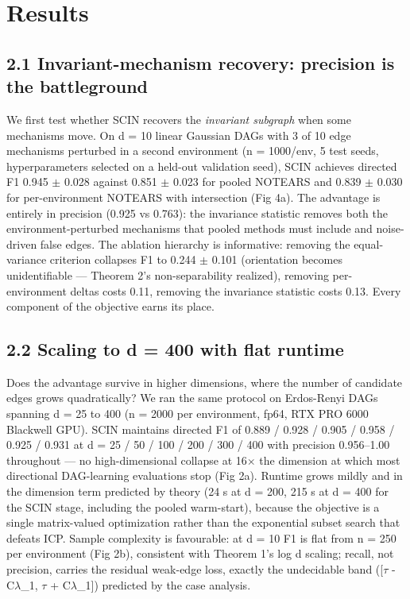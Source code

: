 \documentclass[11pt]{article}
\begin{document}
\section{Results }

\subsection{2.1 Invariant-mechanism recovery: precision is the battleground}\label{results-2.1-invariant-mechanism-recovery-precision-is-the-battleground-exp-a}

We first test whether SCIN recovers the \emph{invariant subgraph} when some
mechanisms move. On d = 10 linear Gaussian DAGs with 3 of 10 edge
mechanisms perturbed in a second environment (n = 1000/env, 5 test
seeds, hyperparameters selected on a held-out validation seed), SCIN
achieves directed F1 0.945 \(\pm\) 0.028 against 0.851 \(\pm\) 0.023 for pooled
NOTEARS and 0.839 \(\pm\) 0.030 for per-environment NOTEARS with
intersection (Fig 4a). The advantage is entirely in precision (0.925
vs 0.763): the invariance statistic removes both the
environment-perturbed mechanisms that pooled methods must include and
noise-driven false edges. The ablation hierarchy is informative:
removing the equal-variance criterion collapses F1 to 0.244 \(\pm\) 0.101
(orientation becomes unidentifiable --- Theorem 2's non-separability
realized), removing per-environment deltas costs 0.11, removing the
invariance statistic costs 0.13. Every component of the objective
earns its place.

\subsection{2.2 Scaling to d = 400 with flat runtime}\label{results-2.2-scaling-to-d-400-with-flat-runtime-gpu}

Does the advantage survive in higher dimensions, where the number of
candidate edges grows quadratically? We ran the same protocol on
Erdos-Renyi DAGs spanning d = 25 to 400 (n = 2000 per environment,
fp64, RTX PRO 6000 Blackwell GPU). SCIN maintains directed F1 of
0.889 / 0.928 / 0.905 / 0.958 / 0.925 / 0.931 at d = 25 / 50 / 100 /
200 / 300 / 400 with precision 0.956--1.00 throughout --- no
high-dimensional collapse at 16\(\times\) the dimension at which most
directional DAG-learning evaluations stop (Fig 2a). Runtime grows
mildly and in the dimension term predicted by theory (24 s at d = 200,
215 s at d = 400 for the SCIN stage, including the pooled warm-start),
because the objective is a single matrix-valued optimization rather
than the exponential subset search that defeats ICP. Sample complexity
is favourable: at d = 10 F1 is flat from n = 250 per environment
(Fig 2b), consistent with Theorem 1's log d scaling; recall, not
precision, carries the residual weak-edge loss, exactly the undecidable
band ({[}\(\tau\) - C\(\lambda\)\_1, \(\tau\) + C\(\lambda\)\_1{]}) predicted by the case analysis.
\end{document}
